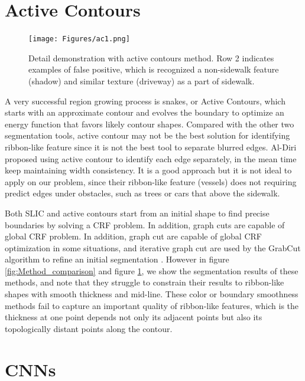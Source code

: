 \section{Active Contours}

\begin{figure}[H]
    \centering
    \texttt{[image: Figures/ac1.png]}
    \caption[Example of Active Contours]{Detail demonstration with active contours method. Row 2 indicates examples of false positive, which is recognized a non-sidewalk feature (shadow) and similar texture (driveway) as a part of sidewalk.}
    \label{fig:ac}
\end{figure}

A very successful region growing process is snakes, or Active Contours, which starts with an approximate contour and evolves the boundary to optimize an energy function that favors likely contour shapes. Compared with the other two segmentation tools, active contour may not be the best solution for identifying ribbon-like feature since it is not the best tool to separate blurred edges. Al-Diri \cite{ActiveContou09} proposed using active contour to identify each edge separately, in the mean time keep maintaining width consistency. It is a good approach but it is not ideal to apply on our problem, since their ribbon-like feature (vessels) does not requiring predict edges under obstacles, such as trees or cars that above the sidewalk.


Both \ac{SLIC} and active contours start from an initial shape to find precise boundaries by solving a \ac{CRF} problem. In addition, graph cuts are capable of global \ac{CRF} problem. In addition, graph cut are capable of global \ac{CRF} optimization in some situations, and iterative graph cut are used by the GrabCut algorithm to refine an initial segmentation \cite{Rother2004-ou}. However in figure \ref{fig:Method_comparison} and figure \ref{fig:ac}, we show the segmentation results of these methods, and note that they struggle to constrain their results to ribbon-like shapes with smooth thickness and mid-line. These color or boundary smoothness methods fail to capture an important quality of ribbon-like features, which is the thickness at one point depends not only its adjacent points but also its topologically distant points along the contour.

\section{\ac{CNNs}}

